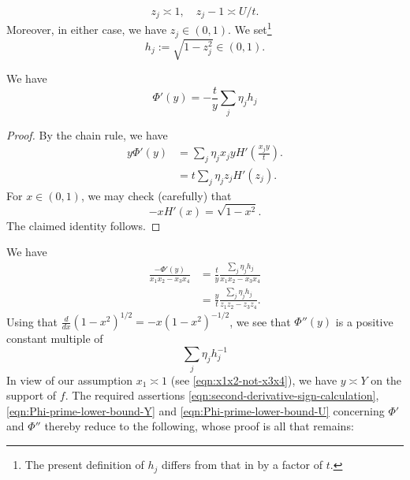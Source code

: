 \documentclass[reqno]{amsart} 
\begin{document}
\begin{equation*}
  z_j \asymp 1, \quad z_j - 1 \asymp U/t.
\end{equation*}
Moreover, in either case, we have $z_j \in (0,1)$.  We set\footnote{The present definition of $h_j$ differs from that in \cite{ki20234} by a factor of $t$.}
\begin{equation*}
  h_j := \sqrt{1 - z_j ^2 } \in (0,1).
\end{equation*}
\begin{lemma}\label{lemma:formula-derivative-Phi}
  We have
  \begin{equation*}
    \Phi ' (y) = - \frac{t}{y} \sum _j \eta _j h_j
  \end{equation*}
\end{lemma}
\begin{proof}
  By the chain rule, we have
  \begin{align*}
    y \Phi '(y) &= \sum _j \eta _j x _j y H' \left( \frac{x _j y}{t} \right).
    \\
                &= t \sum _j \eta _j z_j H' \left( z_j \right).
  \end{align*}
  For $x \in (0,1)$, we may check (carefully) that
  \begin{equation*}
    - x H ' (x) = \sqrt{1 - x ^{2}}.
  \end{equation*}
  The claimed identity follows.
\end{proof}
We have
\begin{align*}
  \frac{-\Phi '(y)}{x_1 x_2 - x_3 x_4} &= \frac{t }{y} \frac{\sum _j \eta _j h _j }{x_1 x_2 - x_3 x_4} \\
                                       &= \frac{y}{t} \frac{\sum _j \eta _j h _j }{ z _1 z _2 - z _3 z _4 }.
\end{align*}
Using that $\frac{d}{d x } (1 - x ^2 )^{1/2} = - x (1 - x^2)^{-1/2}$, we see that $\Phi ''(y)$ is a positive constant multiple of
\begin{equation*}
  \sum  _j \eta _j h_j^{-1}
\end{equation*}
In view of our assumption $x_1 \asymp 1$ (see \eqref{eqn:x1x2-not-x3x4}), we have $y \asymp Y$ on the support of $f$.  The required assertions \eqref{eqn:second-derivative-sign-calculation}, \eqref{eqn:Phi-prime-lower-bound-Y} and \eqref{eqn:Phi-prime-lower-bound-U} concerning $\Phi '$ and $\Phi ''$ thereby reduce to the following, whose proof is all that remains:
\end{document}
